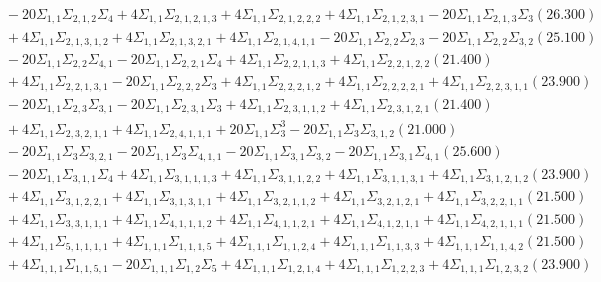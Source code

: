 \documentclass[12pt]{article}
\begin{document}
\begin{landscape}
\begin{align*}
		&\quad\quad -20\Sigma_{1,1}\Sigma_{2,1,2}\Sigma_{4}+4\Sigma_{1,1}\Sigma_{2,1,2,1,3}+4\Sigma_{1,1}\Sigma_{2,1,2,2,2}+4\Sigma_{1,1}\Sigma_{2,1,2,3,1}-20\Sigma_{1,1}\Sigma_{2,1,3}\Sigma_{3}(26.300) \\ 
		&\quad\quad +4\Sigma_{1,1}\Sigma_{2,1,3,1,2}+4\Sigma_{1,1}\Sigma_{2,1,3,2,1}+4\Sigma_{1,1}\Sigma_{2,1,4,1,1}-20\Sigma_{1,1}\Sigma_{2,2}\Sigma_{2,3}-20\Sigma_{1,1}\Sigma_{2,2}\Sigma_{3,2}(25.100) \\ 
		&\quad\quad -20\Sigma_{1,1}\Sigma_{2,2}\Sigma_{4,1}-20\Sigma_{1,1}\Sigma_{2,2,1}\Sigma_{4}+4\Sigma_{1,1}\Sigma_{2,2,1,1,3}+4\Sigma_{1,1}\Sigma_{2,2,1,2,2}(21.400) \\ 
		&\quad\quad +4\Sigma_{1,1}\Sigma_{2,2,1,3,1}-20\Sigma_{1,1}\Sigma_{2,2,2}\Sigma_{3}+4\Sigma_{1,1}\Sigma_{2,2,2,1,2}+4\Sigma_{1,1}\Sigma_{2,2,2,2,1}+4\Sigma_{1,1}\Sigma_{2,2,3,1,1}(23.900) \\ 
		&\quad\quad -20\Sigma_{1,1}\Sigma_{2,3}\Sigma_{3,1}-20\Sigma_{1,1}\Sigma_{2,3,1}\Sigma_{3}+4\Sigma_{1,1}\Sigma_{2,3,1,1,2}+4\Sigma_{1,1}\Sigma_{2,3,1,2,1}(21.400) \\ 
		&\quad\quad +4\Sigma_{1,1}\Sigma_{2,3,2,1,1}+4\Sigma_{1,1}\Sigma_{2,4,1,1,1}+20\Sigma_{1,1}\Sigma_{3}^{3}-20\Sigma_{1,1}\Sigma_{3}\Sigma_{3,1,2}(21.000) \\ 
		&\quad\quad -20\Sigma_{1,1}\Sigma_{3}\Sigma_{3,2,1}-20\Sigma_{1,1}\Sigma_{3}\Sigma_{4,1,1}-20\Sigma_{1,1}\Sigma_{3,1}\Sigma_{3,2}-20\Sigma_{1,1}\Sigma_{3,1}\Sigma_{4,1}(25.600) \\ 
		&\quad\quad -20\Sigma_{1,1}\Sigma_{3,1,1}\Sigma_{4}+4\Sigma_{1,1}\Sigma_{3,1,1,1,3}+4\Sigma_{1,1}\Sigma_{3,1,1,2,2}+4\Sigma_{1,1}\Sigma_{3,1,1,3,1}+4\Sigma_{1,1}\Sigma_{3,1,2,1,2}(23.900) \\ 
		&\quad\quad +4\Sigma_{1,1}\Sigma_{3,1,2,2,1}+4\Sigma_{1,1}\Sigma_{3,1,3,1,1}+4\Sigma_{1,1}\Sigma_{3,2,1,1,2}+4\Sigma_{1,1}\Sigma_{3,2,1,2,1}+4\Sigma_{1,1}\Sigma_{3,2,2,1,1}(21.500) \\ 
		&\quad\quad +4\Sigma_{1,1}\Sigma_{3,3,1,1,1}+4\Sigma_{1,1}\Sigma_{4,1,1,1,2}+4\Sigma_{1,1}\Sigma_{4,1,1,2,1}+4\Sigma_{1,1}\Sigma_{4,1,2,1,1}+4\Sigma_{1,1}\Sigma_{4,2,1,1,1}(21.500) \\ 
		&\quad\quad +4\Sigma_{1,1}\Sigma_{5,1,1,1,1}+4\Sigma_{1,1,1}\Sigma_{1,1,1,5}+4\Sigma_{1,1,1}\Sigma_{1,1,2,4}+4\Sigma_{1,1,1}\Sigma_{1,1,3,3}+4\Sigma_{1,1,1}\Sigma_{1,1,4,2}(21.500) \\ 
		&\quad\quad +4\Sigma_{1,1,1}\Sigma_{1,1,5,1}-20\Sigma_{1,1,1}\Sigma_{1,2}\Sigma_{5}+4\Sigma_{1,1,1}\Sigma_{1,2,1,4}+4\Sigma_{1,1,1}\Sigma_{1,2,2,3}+4\Sigma_{1,1,1}\Sigma_{1,2,3,2}(23.900) \\ 

\end{align*}
\end{landscape}
\end{document}
